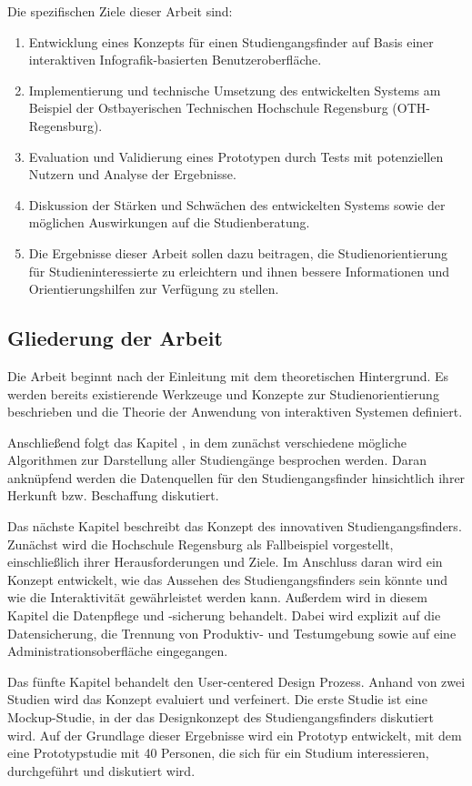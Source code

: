 Die spezifischen Ziele dieser Arbeit sind:
\begin{enumerate}
\item Entwicklung eines Konzepts für einen Studiengangsfinder auf Basis einer
interaktiven Infografik-basierten Benutzeroberfläche.
\item Implementierung und technische Umsetzung des entwickelten Systems am
Beispiel der Ostbayerischen Technischen Hochschule Regensburg (OTH-Regensburg).
\item Evaluation und Validierung eines Prototypen durch Tests mit potenziellen
Nutzern und Analyse der Ergebnisse.
\item Diskussion der Stärken und Schwächen des entwickelten Systems sowie der
möglichen Auswirkungen auf die Studienberatung.
\item Die Ergebnisse dieser Arbeit sollen dazu beitragen, die
Studienorientierung für Studieninteressierte zu erleichtern und ihnen bessere
Informationen und Orientierungshilfen zur Verfügung zu stellen.
\end{enumerate}

\subsection{Gliederung der Arbeit}
Die Arbeit beginnt nach der Einleitung mit dem theoretischen Hintergrund. Es werden bereits existierende Werkzeuge und Konzepte zur Studienorientierung beschrieben und die Theorie der Anwendung von interaktiven Systemen definiert.

Anschließend folgt das Kapitel , in dem zunächst verschiedene mögliche Algorithmen zur Darstellung aller Studiengänge besprochen werden. Daran anknüpfend werden die Datenquellen für den Studiengangsfinder hinsichtlich ihrer Herkunft bzw. Beschaffung diskutiert.

Das nächste Kapitel beschreibt das Konzept des innovativen Studiengangsfinders. Zunächst wird die Hochschule Regensburg als Fallbeispiel vorgestellt, einschließlich ihrer Herausforderungen und Ziele. Im Anschluss daran wird ein Konzept entwickelt, wie das Aussehen des Studiengangsfinders sein könnte und wie die Interaktivität gewährleistet werden kann. Außerdem wird in diesem Kapitel die Datenpflege und -sicherung behandelt. Dabei wird explizit auf die Datensicherung, die Trennung von Produktiv- und Testumgebung sowie auf eine Administrationsoberfläche eingegangen.

Das fünfte Kapitel behandelt den User-centered Design Prozess. Anhand von zwei Studien wird das Konzept evaluiert und verfeinert. Die erste Studie ist eine Mockup-Studie, in der das Designkonzept des Studiengangsfinders diskutiert wird. Auf der Grundlage dieser Ergebnisse wird ein Prototyp entwickelt, mit dem eine Prototypstudie mit 40 Personen, die sich für ein Studium interessieren, durchgeführt und diskutiert wird.

